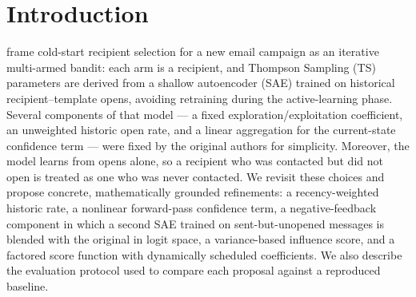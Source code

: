 \section{Introduction}
\label{sec:introduction}

\citet{zid2025active} frame cold-start recipient selection for a
new email campaign as an iterative multi-armed bandit: each arm is a
recipient, and Thompson Sampling (TS) parameters are derived from a shallow
autoencoder (SAE) trained on historical recipient--template opens, avoiding
retraining during the active-learning phase. Several components of that
model --- a fixed exploration/exploitation coefficient, an unweighted
historic open rate, and a linear aggregation for the current-state
confidence term --- were fixed by the original authors for simplicity.
Moreover, the model learns from opens alone, so a recipient who was
contacted but did not open is treated as one who was never contacted. We
revisit these choices and propose concrete, mathematically grounded
refinements: a recency-weighted historic rate, a nonlinear forward-pass
confidence term, a negative-feedback component in which a second SAE trained
on sent-but-unopened messages is blended with the original in logit space, a
variance-based influence score, and a factored score function with
dynamically scheduled coefficients. We also
describe the evaluation protocol used to compare each proposal against a
reproduced baseline.
